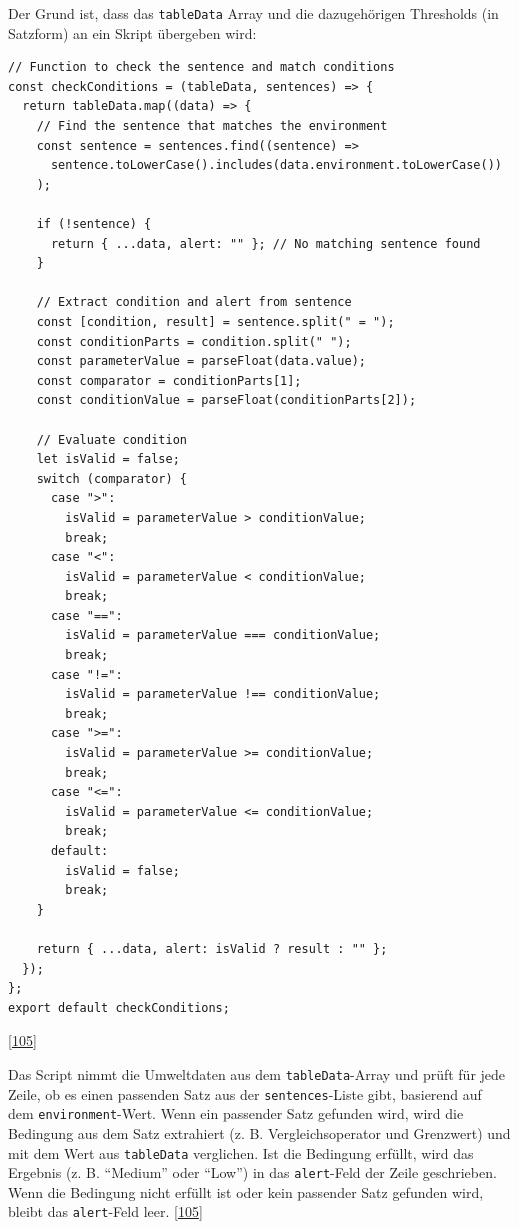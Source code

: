 \documentclass[
    headings=optiontotocandhead,%
    twoside,
    numbers=noenddot,%
    12pt, %
    titlepage, %
    parskip=full, %
    listof=leveldown, 
    numbers=noenddot, %
    a4paper,DIV=14,
    BCOR=15mm,
]{scrbook}
\newcommand{\passthrough}[1]{#1}
\renewenvironment{quote}{\begin{customblockquote}\list{}{\rightmargin=0em\leftmargin=0em}%
\item\relax\color{blockquote-text}\ignorespaces}{\unskip\unskip\endlist\end{customblockquote}}
\begin{document}
Der Grund ist, dass das \passthrough{\lstinline!tableData!} Array und
die dazugehörigen Thresholds (in Satzform) an ein Skript übergeben wird:

\begin{lstlisting}[caption={checkConditions des ConditionChecker Skripts}]
// Function to check the sentence and match conditions
const checkConditions = (tableData, sentences) => {
  return tableData.map((data) => {
    // Find the sentence that matches the environment
    const sentence = sentences.find((sentence) =>
      sentence.toLowerCase().includes(data.environment.toLowerCase())
    );

    if (!sentence) {
      return { ...data, alert: "" }; // No matching sentence found
    }

    // Extract condition and alert from sentence
    const [condition, result] = sentence.split(" = ");
    const conditionParts = condition.split(" ");
    const parameterValue = parseFloat(data.value);
    const comparator = conditionParts[1];
    const conditionValue = parseFloat(conditionParts[2]);

    // Evaluate condition
    let isValid = false;
    switch (comparator) {
      case ">":
        isValid = parameterValue > conditionValue;
        break;
      case "<":
        isValid = parameterValue < conditionValue;
        break;
      case "==":
        isValid = parameterValue === conditionValue;
        break;
      case "!=":
        isValid = parameterValue !== conditionValue;
        break;
      case ">=":
        isValid = parameterValue >= conditionValue;
        break;
      case "<=":
        isValid = parameterValue <= conditionValue;
        break;
      default:
        isValid = false;
        break;
    }

    return { ...data, alert: isValid ? result : "" };
  });
};
export default checkConditions;
\end{lstlisting}

{[}\protect\hyperlink{ref-gpt-ConditionsCheckerScript}{105}{]}

\begin{quote}
Das Script nimmt die Umweltdaten aus dem
\passthrough{\lstinline!tableData!}-Array und prüft für jede Zeile, ob
es einen passenden Satz aus der
\passthrough{\lstinline!sentences!}-Liste gibt, basierend auf dem
\passthrough{\lstinline!environment!}-Wert. Wenn ein passender Satz
gefunden wird, wird die Bedingung aus dem Satz extrahiert (z. B.
Vergleichsoperator und Grenzwert) und mit dem Wert aus
\passthrough{\lstinline!tableData!} verglichen. Ist die Bedingung
erfüllt, wird das Ergebnis (z. B. ``Medium'' oder ``Low'') in das
\passthrough{\lstinline!alert!}-Feld der Zeile geschrieben. Wenn die
Bedingung nicht erfüllt ist oder kein passender Satz gefunden wird,
bleibt das \passthrough{\lstinline!alert!}-Feld leer.
{[}\protect\hyperlink{ref-gpt-ConditionsCheckerScript}{105}{]}
\end{quote}
\end{document}
